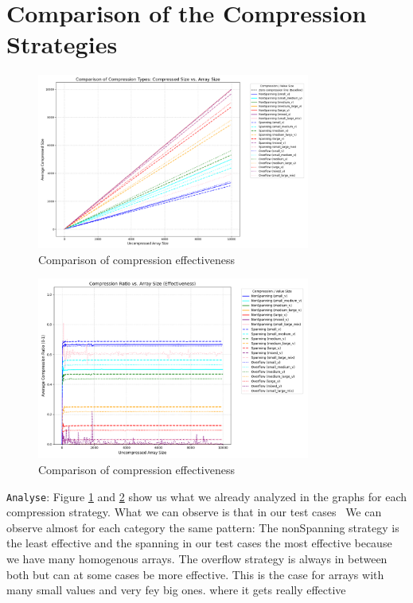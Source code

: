 \documentclass[11pt, a4paper]{article}
\begin{document}
	\section{Comparison of the Compression Strategies}
	\begin{figure}[H]%
		\centering
		\includegraphics[width=0.8\textwidth]{Grafics/Compare/Comparingcompression.png}
		\caption{Comparison of compression effectiveness}
		\label{fig:31}
	\end{figure}
	\begin{figure}[H]%
		\centering
		\includegraphics[width=0.8\textwidth]{Grafics/Compare/ComparingEffectivenesscompression.png}
		\caption{Comparison of compression effectiveness}
		\label{fig:32}
	\end{figure}
	\texttt{Analyse}: Figure \ref{fig:31} and \ref{fig:32} show us what we already analyzed in the graphs for each compression strategy. What we can observe is that in our test cases  We can observe almost for each category the same pattern: The nonSpanning strategy is the least effective and the spanning in our test cases the most effective because we have many homogenous arrays. The overflow strategy is always in between both but can at some cases be more effective. This is the case for arrays with many small values and very fey big ones. where it gets really effective
\end{document}
